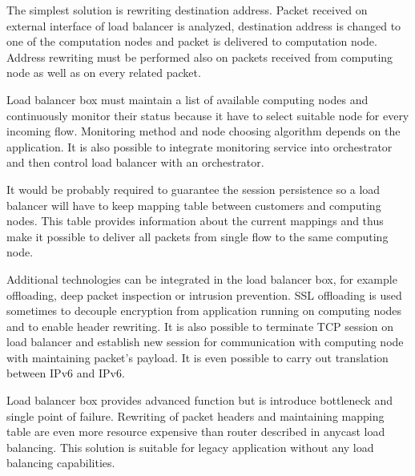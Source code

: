 The simplest solution is rewriting destination address. Packet received on external interface of load balancer is analyzed, destination address is changed to one of the computation nodes and packet is delivered to computation node. Address rewriting must be performed also on packets received from computing node as well as on every related packet. 

Load balancer box must maintain a list of available computing nodes and continuously monitor their status because it have to select suitable node for every incoming flow. Monitoring method and node choosing algorithm depends on the application. It is also possible to integrate monitoring service into orchestrator and then control load balancer with an orchestrator.

It would be probably required to guarantee the session persistence so a load balancer will have to keep mapping table between customers and computing nodes. This table provides information about the current mappings and thus make it possible to deliver all packets from single flow to the same computing node.

Additional technologies can be integrated in the load balancer box, for example offloading, deep packet inspection or intrusion prevention. \Ac{SSL} offloading is used sometimes to decouple encryption from application running on computing nodes and to enable header rewriting. It is also possible to terminate \Ac{TCP} session on load balancer and establish new session for communication with computing node with maintaining packet's payload. It is even possible to carry out translation between \Ac{IPv6} and \Ac{IPv6}.

Load balancer box provides advanced function but is introduce bottleneck and single point of failure. Rewriting of packet headers and maintaining mapping table are even more resource expensive than router described in anycast load balancing. This solution is suitable for legacy application without any load balancing capabilities. 



